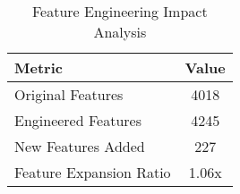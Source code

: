 
\begin{table}[htbp]
\centering
\caption{Feature Engineering Impact Analysis}
\label{tab:feature_engineering}
\begin{tabular}{lc}
\hline
\textbf{Metric} & \textbf{Value} \\
\hline
Original Features & 4018 \\
Engineered Features & 4245 \\
New Features Added & 227 \\
Feature Expansion Ratio & 1.06x \\
\hline
\end{tabular}
\end{table}
